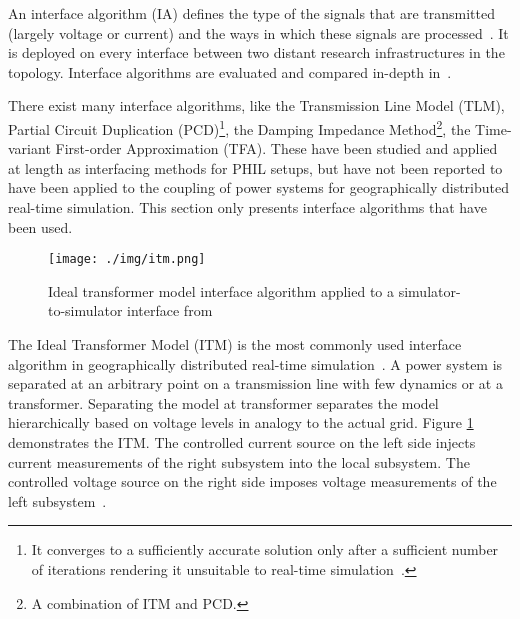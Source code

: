 \documentclass[a4paper]{atseminar}
\begin{document}
An interface algorithm (IA) defines the type of the signals that are transmitted (largely voltage or current) and the ways in which these signals are processed~\cite{ren2008}. 
It is deployed on every interface between two distant research infrastructures in the topology. Interface algorithms are evaluated and compared in-depth in~\cite{ren2008, brandl2017}.

There exist many interface algorithms, like the Transmission Line Model (TLM), Partial Circuit Duplication (PCD)\footnote{It converges to a sufficiently accurate solution only after a sufficient number of iterations rendering it unsuitable to real-time simulation~\cite{ren2008}.}, the Damping Impedance Method\footnote{A combination of ITM and PCD.}, the Time-variant First-order Approximation (TFA). These have been studied and applied at length as interfacing methods for PHIL setups,
but have not been reported to have been applied to the coupling of power systems for geographically distributed real-time simulation. This section only presents interface algorithms that have been used.


\begin{figure}[h]
 \centering
    \texttt{[image: ./img/itm.png]}
 \caption{Ideal transformer model interface algorithm applied to a simulator-to-simulator interface from~\cite{stevic2015sim}}
 \label{MH:fig:itm}
\end{figure}

\label{MH:sec:itm}
The Ideal Transformer Model (ITM) is the most commonly used interface algorithm in geographically distributed real-time simulation~\cite{montoya2020, syed2020standard}. A power system is separated at an arbitrary point on a transmission line with few dynamics or at a transformer. Separating the model at transformer separates the model hierarchically based on voltage levels in analogy to the actual grid. Figure \ref{MH:fig:itm} demonstrates the ITM. The controlled current source on the left side injects current measurements of the right subsystem into the local subsystem. The controlled voltage source on the right side imposes voltage measurements of the left subsystem~\cite{stevic2017europe}.
\end{document}
